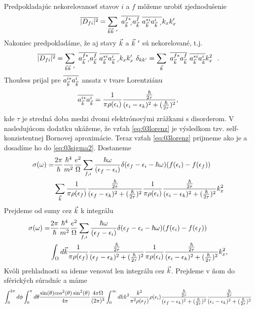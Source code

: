 Predpokladajúc nekorelovanosť stavov $i$ a $f$ môžeme urobiť zjednodušenie
\begin{align}
\overline{|D_{fi}|^2}=\sum_{\vec{k}\vec{k}\ '}
\
\overline{a^{f*}_{\vec{k}\ '}a^f_{\vec{k}}}
\
\overline{a^{*i}_{\vec{k}}a^i_{\vec{k}\ '}}k_xk_x'
\end{align}
Nakoniec predpokladáme, že aj stavy $\vec{k}$ a $\vk\ '$ sú nekorelované, t.j.
\begin{align}
\label{eq:03dfisq3}
\overline{|D_{fi}|^2}=\sum_{\vec{k}\vec{k}\ '}
\ \overline{a^{f*}_{\vec{k}\ '}a^f_{\vec{k}}}
\ \overline{a^{*i}_{\vec{k}}a^i_{\vec{k}\ '}}k_xk_x'
\ \delta_{kk'}=
\sum_{\vec{k}}\ \overline{a^{f*}_{\vec{k}}a^f_{\vec{k}}}
\ \overline{a^{*i}_{\vec{k}}a^i_{\vec{k}}}k_x^2
\ \ \text{.}
\end{align}
Thouless \cite{Thouless} prijal pre  $\overline{a_{\vec{k}}^{i*}a_{\vec{k}}^i}$  ansatz v tvare Lorentziánu
\begin{align}
\label{eq:03lorenz}
\overline{a_{\vec{k}}^{i*}a_{\vec{k}}^i}=\frac{1}{\pi\rho(\epsilon_i)}\frac{\frac{\hbar}{2\tau}}{(\epsilon_i-\epsilon_{k})^2+(\frac{\hbar}{2\tau})^2}\text{,}
\end{align}
kde $\tau$ je stredná doba medzi dvomi elektrónovými zrážkami s disorderom.
V nasledujúcom dodatku ukážeme, že vzťah \eqref{eq:03lorenz} je výsledkom tzv. self-konzistentnej Bornovej aproximácie. Teraz vzťah \eqref{eq:03lorenz} prijmeme ako je a dosadíme ho do \eqref{eq:03sigma2}. Dostaneme
\begin{align}
\sigma(\omega)=&
\frac{2\pi}{\hbar}\frac{\hbar^{4}}{m^2}\frac{e^2}{\Omega}
\sum_{f,i}\frac{\hbar\omega}{(\epsilon_f-\epsilon_i)}\delta(\epsilon_f-\epsilon_i-\hbar\omega)(f(\epsilon_i)-f(\epsilon_f))\\ \notag
&\sum_{\vec{k}}\frac{1}{\pi\rho(\epsilon_f)}\frac{\frac{\hbar}{2\tau}}{(\epsilon_f-\epsilon_{k})^2+(\frac{\hbar}{2\tau})^2}\frac{1}{\pi\rho(\epsilon_i)}\frac{\frac{\hbar}{2\tau}}{(\epsilon_i-\epsilon_{k})^2+(\frac{\hbar}{2\tau})^2}k_x^2
\end{align}
Prejdeme od sumy cez $\vec{k}$ k integrálu
\begin{align}
\label{eq:03sigma3}
\sigma(\omega)=&
\frac{2\pi}{\hbar}\frac{\hbar^{4}}{m^2}\frac{e^2}{\Omega}
\sum_{f,i}\frac{\hbar\omega}{(\epsilon_f-\epsilon_i)}\delta(\epsilon_f-\epsilon_i-\hbar\omega)(f(\epsilon_i)-f(\epsilon_f))\\ \notag
&\int_{\Omega}d\vec{k}\frac{1}{\pi\rho(\epsilon_f)}\frac{\frac{\hbar}{2\tau}}{(\epsilon_f-\epsilon_{k})^2+(\frac{\hbar}{2\tau})^2}\frac{1}{\pi\rho(\epsilon_i)}\frac{\frac{\hbar}{2\tau}}{(\epsilon_i-\epsilon_{k})^2+(\frac{\hbar}{2\tau})^2}k_x^2\text{,}
\end{align}
 Kvôli prehladnosti sa ideme venovať len integrálu cez $\vec{k}$. Prejdeme v ňom do sférických súradníc a máme
\begin{align}
\int_0^{2\pi}d\phi\int_0^\pi d\theta \frac{\sin(\theta)cos^2(\theta)\sin^2(\theta)}{4\pi} \frac{4\pi\Omega}{(2\pi)^{3}}
\int_0^\infty dk k^2 \frac{k^{2}}{\pi^{2}\rho(\epsilon_f)}\rho(\epsilon_i)
\frac{\frac{\hbar}{2\tau}}{(\epsilon_f-\epsilon_{k})^2+(\frac{\hbar}{2\tau})^2} \frac{\frac{\hbar}{2\tau}}{(\epsilon_i-\epsilon_{k})^2+(\frac{\hbar}{2\tau})^2}
\end{align}
